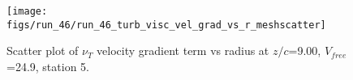 \begin{figure}[H]
\centering
\texttt{[image: figs/run\_46/run\_46\_turb\_visc\_vel\_grad\_vs\_r\_meshscatter]}
\caption{Scatter plot of $\nu_T$ velocity gradient term vs radius at $z/c$=9.00, $V_{free}$=24.9, station 5.}
\label{fig:run_46_turb_visc_vel_grad_vs_r_meshscatter}
\end{figure}


